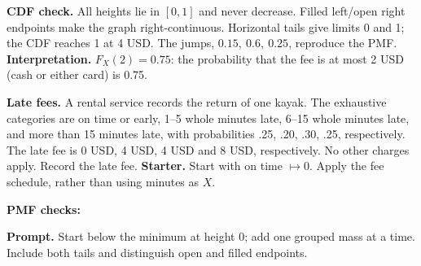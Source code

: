 \textbf{CDF check.} All heights lie in $[0,1]$ and never decrease. Filled left/open right endpoints make the graph right-continuous. Horizontal tails give limits 0 and 1; the CDF reaches 1 at 4 USD. The jumps, $0.15,\ 0.6,\ 0.25$, reproduce the PMF.
\textbf{Interpretation.} $F_X(2)=0.75$: the probability that the fee is at most 2 USD (cash or either card) is 0.75.
\endgroup
\vfill

\textbf{Late fees.} A rental service records the return of one kayak. The exhaustive categories are on time or early, 1--5 whole minutes late, 6--15 whole minutes late, and more than 15 minutes late, with probabilities .25, .20, .30, .25, respectively. The late fee is 0 USD, 4 USD, 4 USD and 8 USD, respectively. No other charges apply. Record the late fee.
\textbf{Starter.} Start with on time $\mapsto0$. Apply the fee schedule, rather than using minutes as $X$.
\par\noindent\begin{minipage}[t]{.37\linewidth}\vspace{0pt}\centering
{}\end{minipage}\hfill\begin{minipage}[t]{.60\linewidth}\vspace{0pt}\centering
{}
\end{minipage}\par
\textbf{PMF checks:} \hrulefill\par
{}
\textbf{Prompt.} Start below the minimum at height 0; add one grouped mass at a time. Include both tails and distinguish open and filled endpoints.
\par\noindent\begin{minipage}[t]{.37\linewidth}\vspace{0pt}\centering
{}\end{minipage}\hfill\begin{minipage}[t]{.60\linewidth}\vspace{0pt}\centering
{}
\end{minipage}\par
